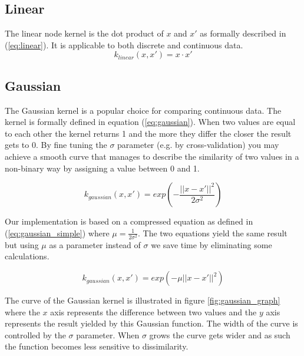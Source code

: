 \documentclass{article}
\begin{document}
\subsection{Linear}
The linear node kernel is the dot product of $x$ and $x'$ as formally described in (\ref{eq:linear}). It is applicable to both discrete and continuous data.
\begin{equation}
\label{eq:linear}
k_{linear}(x, x') = x \cdot x'
\end{equation}

\subsection{Gaussian}
The Gaussian kernel is a popular choice for comparing continuous data. The kernel is formally defined in equation (\ref{eq:gaussian}). When two values are equal to each other the kernel returns 1 and the more they differ the closer the result gets to 0. By fine tuning the $\sigma$ parameter (e.g. by cross-validation) you may achieve a smooth curve that manages to describe the similarity of two values in a non-binary way by assigning a value between 0 and 1.

\begin{equation}
\label{eq:gaussian}
k_{gaussian}(x, x') = exp(-\frac{||x - x'||^2}{2\sigma^2})
\end{equation}

Our implementation is based on a compressed equation as defined in (\ref{eq:gaussian_simple}) where $\mu=\frac{1}{2\sigma^2}$. The two equations yield the same result but using $\mu$ as a parameter instead of $\sigma$ we save time by eliminating some calculations.

\begin{equation}
\label{eq:gaussian_simple}
k_{gaussian}(x, x') = exp(-\mu ||x - x'||^2)
\end{equation}

The curve of the Gaussian kernel is illustrated in figure \ref{fig:gaussian_graph} where the $x$ axis represents the difference between two values and the $y$ axis represents the result yielded by this Gaussian function. The width of the curve is controlled by the $\sigma$ parameter. When $\sigma$ grows the curve gets wider and as such the function becomes less sensitive to dissimilarity.
\end{document}
